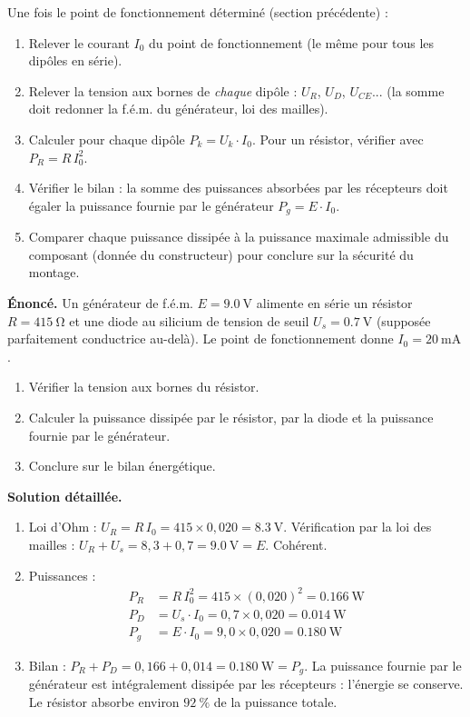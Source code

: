 \documentclass[11pt]{article}
\begin{document}
\begin{methode}
Une fois le point de fonctionnement déterminé (section précédente) :
\begin{enumerate}
\item Relever le courant $I_0$ du point de fonctionnement (le même pour tous les dipôles en série).
\item Relever la tension aux bornes de \emph{chaque} dipôle : $U_R$, $U_D$, $U_{CE}$... (la somme doit redonner la f.é.m. du générateur, loi des mailles).
\item Calculer pour chaque dipôle $P_k = U_k\cdot I_0$. Pour un résistor, vérifier avec $P_R = R\,I_0^2$.
\item Vérifier le bilan : la somme des puissances absorbées par les récepteurs doit égaler la puissance fournie par le générateur $P_g = E\cdot I_0$.
\item Comparer chaque puissance dissipée à la puissance maximale admissible du composant (donnée du constructeur) pour conclure sur la sécurité du montage.
\end{enumerate}
\end{methode}

\begin{exoresolu}
\textbf{Énoncé.} Un générateur de f.é.m. $E = \SI{9,0}{\volt}$ alimente en série un résistor $R = \SI{415}{\ohm}$ et une diode au silicium de tension de seuil $U_s = \SI{0,7}{\volt}$ (supposée parfaitement conductrice au-delà). Le point de fonctionnement donne $I_0 = \SI{20}{\milli\ampere}$.
\begin{enumerate}
\item Vérifier la tension aux bornes du résistor.
\item Calculer la puissance dissipée par le résistor, par la diode et la puissance fournie par le générateur.
\item Conclure sur le bilan énergétique.
\end{enumerate}
\tcblower
\textbf{Solution détaillée.}
\begin{enumerate}
\item Loi d'Ohm : $U_R = R\,I_0 = 415\times 0{,}020 = \SI{8,3}{\volt}$. Vérification par la loi des mailles : $U_R + U_s = 8{,}3 + 0{,}7 = \SI{9,0}{\volt} = E$. Cohérent.
\item Puissances :
\begin{align*}
P_R &= R\,I_0^2 = 415\times (0{,}020)^2 = \SI{0,166}{\watt}\\
P_D &= U_s\cdot I_0 = 0{,}7\times 0{,}020 = \SI{0,014}{\watt}\\
P_g &= E\cdot I_0 = 9{,}0\times 0{,}020 = \SI{0,180}{\watt}
\end{align*}
\item Bilan : $P_R + P_D = 0{,}166 + 0{,}014 = \SI{0,180}{\watt} = P_g$. La puissance fournie par le générateur est intégralement dissipée par les récepteurs : l'énergie se conserve. Le résistor absorbe environ $92\ \%$ de la puissance totale.
\end{enumerate}
\end{exoresolu}
\end{document}
